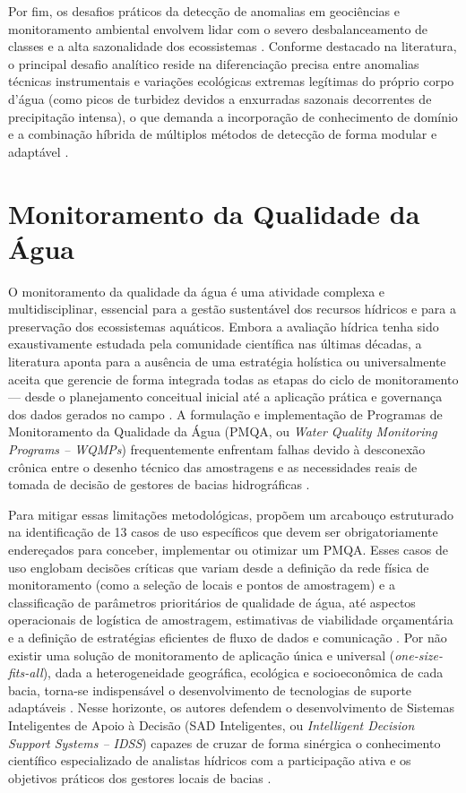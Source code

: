 Por fim, os desafios práticos da detecção de anomalias em geociências e monitoramento ambiental envolvem lidar com o severo desbalanceamento de classes e a alta sazonalidade dos ecossistemas \cite{leigh2019framework, sun2019building}. Conforme destacado na literatura, o principal desafio analítico reside na diferenciação precisa entre anomalias técnicas instrumentais e variações ecológicas extremas legítimas do próprio corpo d'água (como picos de turbidez devidos a enxurradas sazonais decorrentes de precipitação intensa), o que demanda a incorporação de conhecimento de domínio e a combinação híbrida de múltiplos métodos de detecção de forma modular e adaptável \cite{leigh2019framework, sun2019building}.


\section{Monitoramento da Qualidade da Água}
\label{sec:monitoramento_agua}

O monitoramento da qualidade da água é uma atividade complexa e multidisciplinar, essencial para a gestão sustentável dos recursos hídricos e para a preservação dos ecossistemas aquáticos. Embora a avaliação hídrica tenha sido exaustivamente estudada pela comunidade científica nas últimas décadas, a literatura aponta para a ausência de uma estratégia holística ou universalmente aceita que gerencie de forma integrada todas as etapas do ciclo de monitoramento --- desde o planejamento conceitual inicial até a aplicação prática e governança dos dados gerados no campo \cite{behmel2016water}. A formulação e implementação de Programas de Monitoramento da Qualidade da Água (PMQA, ou \textit{Water Quality Monitoring Programs -- WQMPs}) frequentemente enfrentam falhas devido à desconexão crônica entre o desenho técnico das amostragens e as necessidades reais de tomada de decisão de gestores de bacias hidrográficas \cite{behmel2016water}.

Para mitigar essas limitações metodológicas,  propõem um arcabouço estruturado na identificação de 13 casos de uso específicos que devem ser obrigatoriamente endereçados para conceber, implementar ou otimizar um PMQA. Esses casos de uso englobam decisões críticas que variam desde a definição da rede física de monitoramento (como a seleção de locais e pontos de amostragem) e a classificação de parâmetros prioritários de qualidade de água, até aspectos operacionais de logística de amostragem, estimativas de viabilidade orçamentária e a definição de estratégias eficientes de fluxo de dados e comunicação \cite{behmel2016water}. Por não existir uma solução de monitoramento de aplicação única e universal (\textit{one-size-fits-all}), dada a heterogeneidade geográfica, ecológica e socioeconômica de cada bacia, torna-se indispensável o desenvolvimento de tecnologias de suporte adaptáveis \cite{behmel2016water}. Nesse horizonte, os autores defendem o desenvolvimento de Sistemas Inteligentes de Apoio à Decisão (SAD Inteligentes, ou \textit{Intelligent Decision Support Systems -- IDSS}) capazes de cruzar de forma sinérgica o conhecimento científico especializado de analistas hídricos com a participação ativa e os objetivos práticos dos gestores locais de bacias \cite{behmel2016water}.


